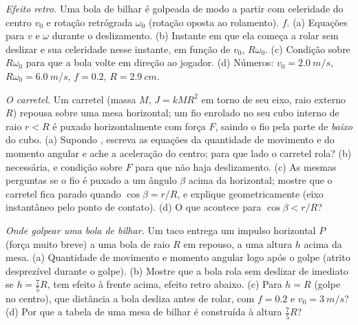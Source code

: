 \begin{exercise}[$\star\star$]\label{exo:b2:rigid-body-mechanics:9}
\emph{Efeito retro.} Uma bola de bilhar é golpeada de modo a partir com
celeridade do centro $v_0$ e rotação retrógrada $\omega_0$ (rotação oposta ao
rolamento).  $f$. (a) Equações para $v$ e $\omega$
durante o deslizamento. (b) Instante em que ela começa a rolar sem deslizar e
sua celeridade nesse instante, em função de $v_0$, $R\omega_0$. (c) Condição sobre
$R\omega_0$ para que a bola volte em direção ao jogador. (d) Números:
$v_0 = \qty{2.0}{m/s}$, $R\omega_0 = \qty{6.0}{m/s}$, $f = 0.2$,
$R = \qty{2.9}{cm}$.
\end{exercise}

\begin{exercise}[$\star\star\star$]\label{exo:b2:rigid-body-mechanics:10}
\emph{O carretel.} Um carretel (massa $M$,  $J = kMR^2$ em torno de
seu eixo, raio externo $R$) repousa sobre uma mesa horizontal; um fio enrolado
no seu cubo interno de raio $r < R$ é puxado horizontalmente com força
$F$, saindo o fio pela parte de \emph{baixo} do cubo. (a) Supondo
, escreva as equações da quantidade de movimento e do
momento angular e ache a aceleração do centro; para que lado o
carretel rola? (b)  necessária, e condição sobre $F$ para
que não haja deslizamento. (c) As mesmas perguntas se o fio é puxado a um ângulo
$\beta$ acima da horizontal; mostre que o carretel fica parado quando
$\cos\beta = r/R$, e explique geometricamente (eixo instantâneo pelo
ponto de contato). (d) O que acontece para $\cos\beta < r/R$?
\end{exercise}

\begin{exercise}[$\star\star\star$]\label{exo:b2:rigid-body-mechanics:11}
\emph{Onde golpear uma bola de bilhar.} Um taco entrega um impulso
horizontal $P$ (força muito breve) a uma bola de raio $R$ em repouso, a
uma altura $h$ acima da mesa. (a) Quantidade de movimento e momento angular logo após
o golpe (atrito desprezível durante o golpe). (b) Mostre que a bola
rola sem deslizar de imediato se $h = \tfrac75R$, tem efeito à frente acima,
efeito retro abaixo. (c) Para $h = R$ (golpe no centro), que distância a bola
desliza antes de rolar, com $f = 0.2$ e $v_0 = \qty{3}{m/s}$? (d) Por que
a tabela de uma mesa de bilhar é construída à altura $\tfrac75R$?
\end{exercise}

